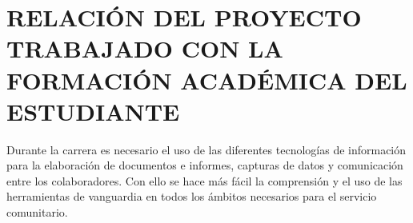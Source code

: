 \chapter{RELACIÓN DEL PROYECTO TRABAJADO CON LA FORMACIÓN ACADÉMICA	DEL ESTUDIANTE}

    Durante la carrera es necesario el uso de las diferentes tecnologías de información para la elaboración de documentos e informes, capturas de datos y comunicación entre los colaboradores. Con ello se hace más fácil la comprensión y el uso de las herramientas de vanguardia en todos los ámbitos necesarios para el servicio comunitario.
    

        
        
        
        
        
    
    
 
\pagebreak